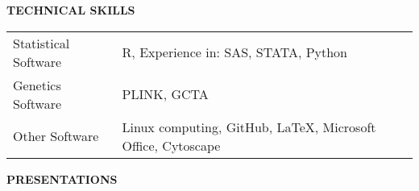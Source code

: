 \documentclass[10pt]{article}
\begin{document}
{ \bf TECHNICAL SKILLS} \hrulefill \\
\setlength\intextsep{0mm}
\begin{center}
	\begin{table}[H]
		\centering
		\begin{tabular}{@{}p{3.9cm}@{}@{}p{13cm}@{}}
			Statistical Software  &  R, Experience in: SAS, STATA, Python       \\ 
			Genetics Software  & PLINK, GCTA   \\ 
			Other Software  & Linux computing, GitHub, \LaTeX, Microsoft Office, Cytoscape
		\end{tabular}
	\end{table}
\end{center}

\pagebreak

{ \bf PRESENTATIONS} \hrulefill \\
\end{document}
